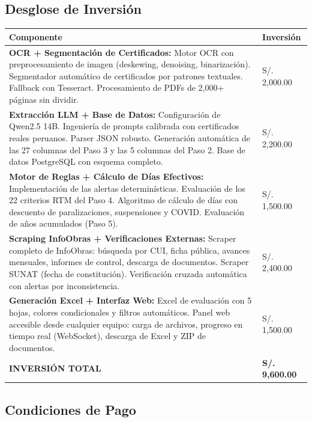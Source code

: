\documentclass[11pt,a4paper]{article}
\begin{document}
\subsection{Desglose de Inversión}

\begin{center}
\begin{tabular}{|>{\raggedright\arraybackslash}m{9.5cm}|>{\centering\arraybackslash}m{3cm}|}
\hline
\textbf{Componente} & \textbf{Inversión} \\
\hline
\textbf{OCR + Segmentación de Certificados:} Motor OCR con preprocesamiento de imagen (deskewing, denoising, binarización). Segmentador automático de certificados por patrones textuales. Fallback con Tesseract. Procesamiento de PDFs de 2,000+ páginas sin dividir. & S/. 2,000.00 \\
\hline
\textbf{Extracción LLM + Base de Datos:} Configuración de Qwen2.5 14B. Ingeniería de prompts calibrada con certificados reales peruanos. Parser JSON robusto. Generación automática de las 27 columnas del Paso 3 y las 5 columnas del Paso 2. Base de datos PostgreSQL con esquema completo. & S/. 2,200.00 \\
\hline
\textbf{Motor de Reglas + Cálculo de Días Efectivos:} Implementación de las alertas determinísticas. Evaluación de los 22 criterios RTM del Paso 4. Algoritmo de cálculo de días con descuento de paralizaciones, suspensiones y COVID. Evaluación de años acumulados (Paso 5). & S/. 1,500.00 \\
\hline
\textbf{Scraping InfoObras + Verificaciones Externas:} Scraper completo de InfoObras: búsqueda por CUI, ficha pública, avances mensuales, informes de control, descarga de documentos. Scraper SUNAT (fecha de constitución). Verificación cruzada automática con alertas por inconsistencia. & S/. 2,400.00 \\
\hline
\textbf{Generación Excel + Interfaz Web:} Excel de evaluación con 5 hojas, colores condicionales y filtros automáticos. Panel web accesible desde cualquier equipo: carga de archivos, progreso en tiempo real (WebSocket), descarga de Excel y ZIP de documentos. & S/. 1,500.00 \\
\hline
\textbf{INVERSIÓN TOTAL} & \textbf{S/. 9,600.00} \\
\hline
\end{tabular}
\end{center}



\subsection{Condiciones de Pago}
\end{document}
